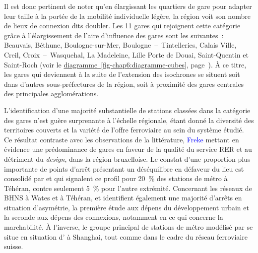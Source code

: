 \begin{refsegment}
Il est donc pertinent de noter qu'en élargissant les quartiers de gare pour adapter leur taille à la portée de la mobilité individuelle légère, la région voit son nombre de lieux de connexion dits  doubler. Les 11 gares qui rejoignent cette catégorie grâce à l'élargissement de l'aire d'influence des gares sont les suivantes~: Beauvais, Béthune, Boulogne-sur-Mer, Boulogne~–~Tintelleries, Calais Ville, Creil, Croix~–~Wasquehal, La Madeleine, Lille Porte de Douai, Saint-Quentin et Saint-Roch (voir le \hyperref[fig-chap6:diagramme-cubes]{diagramme~\ref{fig-chap6:diagramme-cubes}}, page~\pageref{fig-chap6:diagramme-cubes}). À ce titre, les gares qui deviennent  à la suite de l'extension des isochrones se situent soit dans d'autres sous-préfectures de la région, soit à proximité des gares centrales des principales agglomérations.%

L'identification d'une majorité substantielle de stations classées dans la catégorie des gares  n'est guère surprenante à l'échelle régionale, étant donné la diversité des territoires couverts et la variété de l'offre ferroviaire au sein du système étudié. Ce résultat contraste avec les observations de la littérature, \textcolor{blue}{Freke} \textcolor{blue}{\textcite[46]{caset_planning_2019}} mettant en évidence une prédominance de gares  en faveur de la qualité du service \acrfull{RER} et au détriment du \textsl{design}, dans la région bruxelloise. Le constat d'une proportion plus importante de points d'arrêt présentant un déséquilibre en défaveur du lieu est consolidé par \textcolor{blue}{\textcite[190]{kutty_assessment_2018}} et \textcolor{blue}{\textcite[19]{monajem_evaluation_2015}} qui signalent ce profil pour 20~\% des stations de métro à Téhéran, contre seulement 5~\% pour l'autre extrémité. Concernant les réseaux de \acrfull{BHNS} à Wates et à Téhéran, \textcolor{blue}{\textcite[15]{alfyan_node-place_2022}} et \textcolor{blue}{\textcite[13]{pezeshknejad_evaluating_2020}} identifient également une majorité d'arrêts en situation d'asymétrie, la première étude aux dépens du développement urbain et la seconde aux dépens des connexions, notamment en ce qui concerne la marchabilité. À l'inverse, le groupe principal de stations de métro modélisé par \textcolor{blue}{\textcite[12]{dou_integrating_2021}} se situe en situation d' à Shanghai, tout comme \textcolor{blue}{\textcite[197]{reusser_classifying_2008}} dans le cadre du réseau ferroviaire suisse.%


\end{refsegment}
